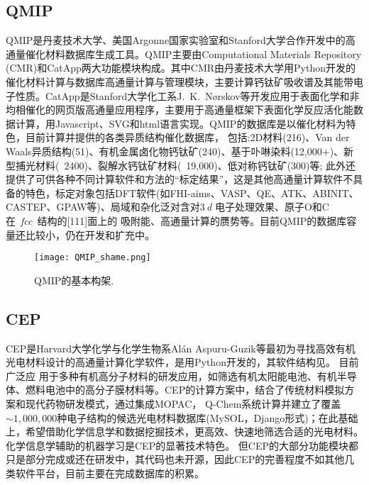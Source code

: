 \subsection{\rm{QMIP}}
\textrm{QMIP}是丹麦技术大学、美国\textrm{Argonne}国家实验室和\textrm{Stanford}大学合作开发中的高通量催化材料数据库生成工具\cite{QMIP_URL}。\textrm{QMIP}主要由\textrm{Computational Materials Repository (CMR)}和\textrm{CatApp}两大功能模块构成。其中\textrm{CMR}由丹麦技术大学用\textrm{Python}开发的催化材料计算与数据库高通量计算与管理模块\cite{CMR_URL}，主要计算钙钛矿吸收谱及其能带电子性质。\textrm{CatApp}是\textrm{Stanford}大学化工系\textrm{J.~K.~N{\o}rskov}等开发应用于表面化学和非均相催化的网页版高通量应用程序\cite{ACIE51-272_2012}，主要用于高通量框架下表面化学反应活化能数据计算，用\textrm{Javascript}、\textrm{SVG}和\textrm{html}语言实现。\textrm{QMIP}的数据库是以催化材料为特色，目前计算并提供的各类异质结构催化数据库， 包括:\textrm{2D}材料(216)、\textrm{Van der Waals}异质结构(51)、有机金属卤化物钙钛矿(240)、基于卟啉染料(12,000+)、新型捕光材料(~2400)、裂解水钙钛矿材料(~19,000)、低对称钙钛矿(300)等; 此外还提供了可供各种不同计算软件和方法的“标定结果”，这是其他高通量计算软件不具备的特色，标定对象包括\textrm{DFT}软件(如\textrm{FHI-aims}\cite{CPC180-2175_2009}、VASP、QE、ATK、ABINIT、CASTEP\cite{ZFK220-567_2005}、GPAW\cite{JPCM22-253202_2010}等)、局域和杂化泛对含对3\,\textit{d} 电子处理效果、原子\textrm{O}和\textrm{C}在~\textit{fcc}~结构的[111]面上的 吸附能、高通量计算的赝势等。目前\textrm{QMIP}的数据库容量还比较小，仍在开发和扩充中。
\begin{figure}[h!]
\centering
\texttt{[image: QMIP\_shame.png]}%
\caption{\textrm{QMIP}的基本构架.}%
\label{Auto_Flow_Platform-3}
\end{figure}

\subsection{\rm{CEP}}
\textrm{CEP}是\textrm{Harvard}大学化学与化学生物系\textrm{Al{\'a}n Aspuru-Guzik}等最初为寻找高效有机光电材料设计的高通量计算化学软件\cite{JPCL2-2241_2011}，是用\textrm{Python}开发的，其软件结构见。
目前广泛应 用于多种有机高分子材料的研发应用，如筛选有机太阳能电池、有机半导体、燃料电池中的高分子膜材料等。\textrm{CEP}的计算方案中，结合了传统材料模拟方案和现代药物研发模式，通过集成\textrm{MOPAC}\cite{JCAMD4-1-1990}， \textrm{Q-Chem}\cite{PCCP8-3172_2006}系统计算并建立了覆盖$\sim1,000,000$种电子结构的候选光电材料数据库(\textrm{MySOL}，\textrm{Django}形式)；在此基础上，希望借助化学信息学和数据挖掘技术，更高效、快速地筛选合适的光电材料。化学信息学辅助的机器学习是\textrm{CEP}的显著技术特色。 但\textrm{CEP}的大部分功能模块都只是部分完成或还在研发中，其代码也未开源，因此\textrm{CEP}的完善程度不如其他几类软件平台，目前主要在完成数据库的积累。 

